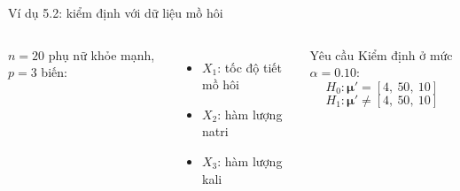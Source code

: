 \begin{frame}{Ví dụ 5.2: kiểm định với dữ liệu mồ hôi}
\begin{columns}[T,onlytextwidth]
    \small
    \(n=20\) phụ nữ khỏe mạnh, \(p=3\) biến:
    \begin{itemize}\setlength{\itemsep}{1pt}
      \item \(X_1\): tốc độ tiết mồ hôi
      \item \(X_2\): hàm lượng natri
      \item \(X_3\): hàm lượng kali
    \end{itemize}
    \vspace{0.1cm}
    \begin{exampleblock}{Yêu cầu}
      Kiểm định ở mức \(\alpha = 0.10\):
      \[
        H_0: \boldsymbol{\mu}'=[4,\ 50,\ 10]
      \]
      \vspace{-0.45cm}
      \[
        H_1: \boldsymbol{\mu}'\ne[4,\ 50,\ 10]
      \]
    \end{exampleblock}
  \end{columns}
\end{frame}

